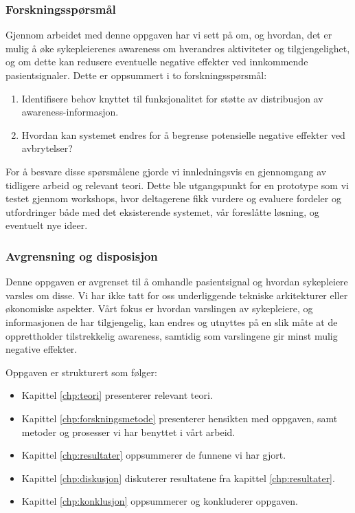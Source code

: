 \subsubsection{Forskningsspørsmål}
Gjennom arbeidet med denne oppgaven har vi sett på om, og hvordan, det er mulig å øke sykepleierenes awareness om hverandres aktiviteter og tilgjengelighet, og om dette kan redusere eventuelle negative effekter ved innkommende pasientsignaler. Dette er oppsummert i to forskningsspørsmål:

\begin{enumerate}
  \item Identifisere behov knyttet til funksjonalitet for støtte av distribusjon av awareness-informasjon.
  \item Hvordan kan systemet endres for å begrense potensielle negative effekter ved avbrytelser?
\end{enumerate}

\noindent
For å besvare disse spørsmålene gjorde vi innledningsvis en gjennomgang av tidligere arbeid og relevant teori. Dette ble utgangspunkt for en prototype som vi testet gjennom workshops, hvor deltagerene fikk vurdere og evaluere fordeler og utfordringer både med det eksisterende systemet, vår foreslåtte løsning, og eventuelt nye ideer. 

\subsubsection{Avgrensning og disposisjon}
Denne oppgaven er avgrenset til å omhandle pasientsignal og hvordan sykepleiere varsles om disse. Vi har ikke tatt for oss underliggende tekniske arkitekturer eller økonomiske aspekter. Vårt fokus er hvordan varslingen av sykepleiere, og informasjonen de har tilgjengelig, kan endres og utnyttes på en slik måte at de opprettholder tilstrekkelig awareness, samtidig som varslingene gir minst mulig negative effekter.

\noindent
Oppgaven er strukturert som følger:
\begin{itemize}
\item Kapittel \ref{chp:teori} presenterer relevant teori.
\item Kapittel \ref{chp:forskningsmetode} presenterer hensikten med oppgaven, samt metoder og prosesser vi har benyttet i vårt arbeid. 
\item Kapittel \ref{chp:resultater} oppsummerer de funnene vi har gjort.
\item Kapittel \ref{chp:diskusjon} diskuterer resultatene fra kapittel \ref{chp:resultater}.
\item Kapittel \ref{chp:konklusjon} oppsummerer og konkluderer oppgaven.
\end{itemize}
